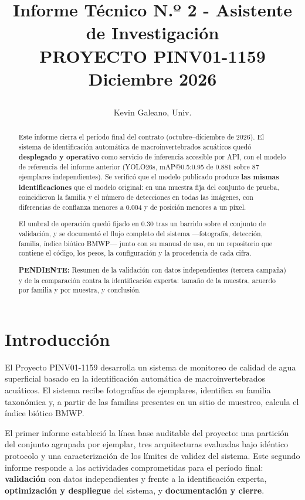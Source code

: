 \documentclass[onecolumn]{article}
\title{\vspace{-1.5cm}
\begin{center}
\LARGE
\textbf{Informe Técnico N.º 2 - Asistente de Investigación\\
PROYECTO PINV01-1159} \\
\Large Diciembre 2026
\vspace{0.5cm}
\end{center}
}
\author[1]{Kevin Galeano, Univ.\orcidlink{0009-0002-5536-8315}}
\affil[1]{
\small
gsmkev@gmail.com ArtICS Lab S.R.L. San Lorenzo, Paraguay.
}
\date{}
\newcommand{\pendiente}[1]{\colorbox{yellow!40}{\parbox{0.95\linewidth}{\small\textbf{PENDIENTE:} #1}}}
\begin{document}
\thispagestyle{firstpagestyle}
\maketitle

\vspace{-0.5cm}
\begin{abstract}
Este informe cierra el período final del contrato (octubre--diciembre de 2026). El sistema de identificación automática de macroinvertebrados acuáticos quedó \textbf{desplegado y operativo} como servicio de inferencia accesible por API, con el modelo de referencia del informe anterior (YOLO26s, mAP@0.5:0.95 de 0.881 sobre 87 ejemplares independientes). Se verificó que el modelo publicado produce \textbf{las mismas identificaciones} que el modelo original: en una muestra fija del conjunto de prueba, coincidieron la familia y el número de detecciones en todas las imágenes, con diferencias de confianza menores a 0.004 y de posición menores a un píxel.

El umbral de operación quedó fijado en 0.30 tras un barrido sobre el conjunto de validación, y se documentó el flujo completo del sistema ---fotografía, detección, familia, índice biótico BMWP--- junto con su manual de uso, en un repositorio que contiene el código, los pesos, la configuración y la procedencia de cada cifra.

\pendiente{Resumen de la validación con datos independientes (tercera campaña) y de la comparación contra la identificación experta: tamaño de la muestra, acuerdo por familia y por muestra, y conclusión.}
\vspace{0.5cm}
\end{abstract}

\section{Introducción}

El Proyecto PINV01-1159 desarrolla un sistema de monitoreo de calidad de agua superficial basado en la identificación automática de macroinvertebrados acuáticos. El sistema recibe fotografías de ejemplares, identifica su familia taxonómica y, a partir de las familias presentes en un sitio de muestreo, calcula el índice biótico BMWP.

El primer informe estableció la línea base auditable del proyecto: una partición del conjunto agrupada por ejemplar, tres arquitecturas evaluadas bajo idéntico protocolo y una caracterización de los límites de validez del sistema. Este segundo informe responde a las actividades comprometidas para el período final: \textbf{validación} con datos independientes y frente a la identificación experta, \textbf{optimización y despliegue} del sistema, y \textbf{documentación y cierre}.
\end{document}
